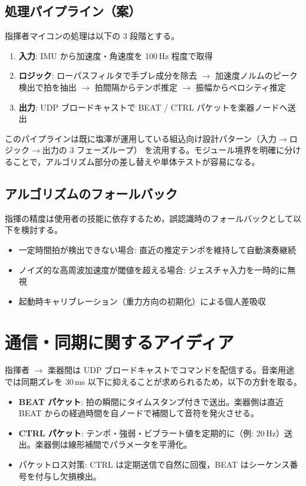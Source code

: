 \subsection{処理パイプライン（案）}

指揮者マイコンの処理は以下の 3 段階とする。

\begin{enumerate}
  \item \textbf{入力}: IMU から加速度・角速度を 100\,Hz 程度で取得
  \item \textbf{ロジック}: ローパスフィルタで手ブレ成分を除去 $\rightarrow$ 加速度ノルムのピーク検出で拍を抽出 $\rightarrow$ 拍間隔からテンポ推定 $\rightarrow$ 振幅からベロシティ推定
  \item \textbf{出力}: UDP ブロードキャストで BEAT / CTRL パケットを楽器ノードへ送出
\end{enumerate}

このパイプラインは既に塩澤が運用している組込向け設計パターン（入力$\rightarrow$ロジック$\rightarrow$出力の 3 フェーズループ）\cite{embedded_module_arch} を流用する。モジュール境界を明確に分けることで，アルゴリズム部分の差し替えや単体テストが容易になる。

\subsection{アルゴリズムのフォールバック}

指揮の精度は使用者の技能に依存するため，誤認識時のフォールバックとして以下を検討する。

\begin{itemize}
  \item 一定時間拍が検出できない場合: 直近の推定テンポを維持して自動演奏継続
  \item ノイズ的な高周波加速度が閾値を超える場合: ジェスチャ入力を一時的に無視
  \item 起動時キャリブレーション（重力方向の初期化）による個人差吸収
\end{itemize}

\section{通信・同期に関するアイディア}

指揮者 $\rightarrow$ 楽器間は UDP ブロードキャストでコマンドを配信する。音楽用途では同期ズレを 30\,ms 以下に抑えることが求められるため\cite{music_latency}，以下の方針を取る。

\begin{itemize}
  \item \textbf{BEAT パケット}: 拍の瞬間にタイムスタンプ付きで送出。楽器側は直近 BEAT からの経過時間を自ノードで補間して音符を発火させる。
  \item \textbf{CTRL パケット}: テンポ・強弱・ビブラート値を定期的に（例: 20\,Hz）送出。楽器側は線形補間でパラメータを平滑化。
  \item パケットロス対策: CTRL は定期送信で自然に回復，BEAT はシーケンス番号を付与し欠損検出。
\end{itemize}

